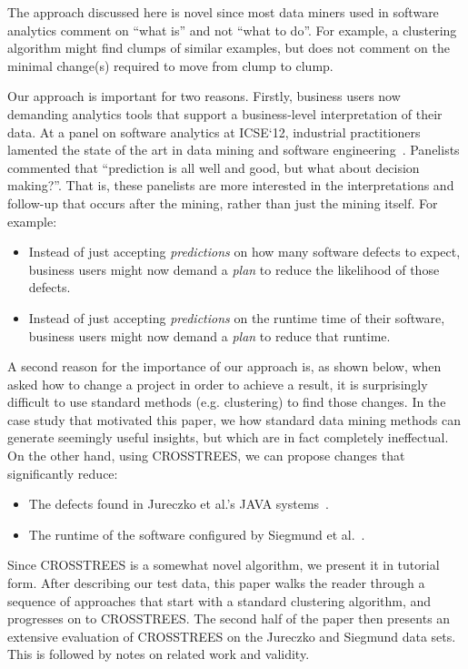 \documentclass{sig-alternate}
\newcommand{\bi}{\begin{itemize}}
\newcommand{\ei}{\end{itemize}}
\begin{document}
The approach discussed here is novel since most data miners used in software analytics
comment on ``what is'' and not ``what to do''. For example, a clustering
algorithm might find clumps of similar examples, but does not comment on the minimal
change(s) required to move from clump to clump.

Our approach is important for two reasons. Firstly, business users now demanding analytics tools that support a business-level interpretation of their data. At a panel on software analytics at ICSE`12, industrial practitioners lamented the state of the art in data mining and software engineering~\cite{menzies12a}. Panelists commented that ``prediction is all well and good, but what about decision making?''. That is, these panelists are more interested in the interpretations and follow-up that occurs after the mining, rather than just the mining itself. For example:
\bi
\item
Instead of just accepting {\em predictions} on how many software defects to expect, business users might now demand a {\em plan} to reduce the likelihood of those defects.
\item
Instead of just accepting {\em predictions} on the runtime time of their software, business users might now demand a {\em plan} to reduce that runtime. 
\ei
A second reason for the importance of our approach is, as shown below,
when asked how to change a project in order to achieve a result, it is surprisingly
difficult to use standard methods (e.g. clustering) to find those changes.
In the case study that motivated this paper, we how  standard data mining methods
can generate  seemingly
useful insights, but which are in fact completely ineffectual. On the other hand,
using CROSSTREES, we can propose changes that significantly reduce:
\bi
\item The  defects found  in Jureczko et al.'s    JAVA systems~\cite{jureczko10}.
\item The runtime of the  software    configured by  Siegmund et al.~\cite{sven12}.
\ei 
Since CROSSTREES is a somewhat novel algorithm, we present it in tutorial form.
After describing our test data,
this paper  walks the reader through a sequence of approaches that start
with a standard clustering algorithm, and progresses on to CROSSTREES. The second
half of the paper then presents an extensive evaluation of CROSSTREES on 
the Jureczko  and Siegmund data sets. This is followed by notes on related work
and validity.



\end{document}
